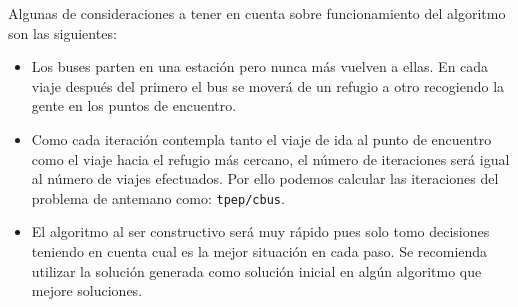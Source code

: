 \documentclass[letter, 10pt]{article}
\begin{document}
    \begin{algorithm}[H]
    \end{algorithm}

    Algunas de consideraciones a tener en cuenta sobre funcionamiento del
    algoritmo son las siguientes:
    \begin{itemize}
        \item
            Los buses parten en una estación pero nunca más vuelven a
            ellas. En cada viaje después del primero el bus se moverá de un
            refugio a otro recogiendo la gente en los puntos de encuentro.
        \item
            Como cada iteración contempla tanto el viaje de ida al punto de
            encuentro como el viaje hacia el refugio más cercano, el número de
            iteraciones será igual al número de viajes efectuados. Por ello
            podemos calcular las iteraciones del problema de antemano como:
            \texttt{tpep/cbus}.
        \item
            El algoritmo al ser constructivo será muy rápido pues solo tomo
            decisiones teniendo en cuenta cual es la mejor situación en cada
            paso. Se recomienda utilizar la solución generada como solución
            inicial en algún algoritmo que mejore soluciones.
    \end{itemize}
\end{document}
